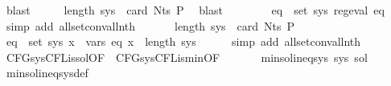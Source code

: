 \begin{isabellebody}
\ blast\isanewline
\ \ \isamarkupfalse%
\ \isamarkupfalse%
\ {\isachardoublequoteopen}length\ sys\ {\isacharequal}{\kern0pt}\ card\ {\isacharparenleft}{\kern0pt}Nts\ P{\isacharparenright}{\kern0pt}{\isachardoublequoteclose}\ \isamarkupfalse%
\ blast\isanewline
\ \ \isamarkupfalse%
\ \isamarkupfalse%
\ {\isacharasterisk}{\kern0pt}\ \isamarkupfalse%
\ {\isachardoublequoteopen}{\isasymforall}eq\ {\isasymin}\ set\ sys{\isachardot}{\kern0pt}\ reg{\isacharunderscore}{\kern0pt}eval\ eq{\isachardoublequoteclose}\ \isamarkupfalse%
\ {\isacharparenleft}{\kern0pt}simp\ add{\isacharcolon}{\kern0pt}\ all{\isacharunderscore}{\kern0pt}set{\isacharunderscore}{\kern0pt}conv{\isacharunderscore}{\kern0pt}all{\isacharunderscore}{\kern0pt}nth{\isacharparenright}{\kern0pt}\isanewline
\ \ \isamarkupfalse%
\ \isamarkupfalse%
\ {\isacharasterisk}{\kern0pt}\ {\isacartoucheopen}length\ sys\ {\isacharequal}{\kern0pt}\ card\ {\isacharparenleft}{\kern0pt}Nts\ P{\isacharparenright}{\kern0pt}{\isacartoucheclose}\ \isamarkupfalse%
\ {\isachardoublequoteopen}{\isasymforall}eq\ {\isasymin}\ set\ sys{\isachardot}{\kern0pt}\ {\isasymforall}x\ {\isasymin}\ vars\ eq{\isachardot}{\kern0pt}\ x\ {\isacharless}{\kern0pt}\ length\ sys{\isachardoublequoteclose}\isanewline
\ \ \ \ \isamarkupfalse%
\ {\isacharparenleft}{\kern0pt}simp\ add{\isacharcolon}{\kern0pt}\ all{\isacharunderscore}{\kern0pt}set{\isacharunderscore}{\kern0pt}conv{\isacharunderscore}{\kern0pt}all{\isacharunderscore}{\kern0pt}nth{\isacharparenright}{\kern0pt}\isanewline
\ \ \isamarkupfalse%
\ \isamarkupfalse%
\ CFG{\isacharunderscore}{\kern0pt}sys{\isacharunderscore}{\kern0pt}CFL{\isacharunderscore}{\kern0pt}is{\isacharunderscore}{\kern0pt}sol{\isacharbrackleft}{\kern0pt}OF\ {\isacharasterisk}{\kern0pt}{\isacharbrackright}{\kern0pt}\ CFG{\isacharunderscore}{\kern0pt}sys{\isacharunderscore}{\kern0pt}CFL{\isacharunderscore}{\kern0pt}is{\isacharunderscore}{\kern0pt}min{\isacharbrackleft}{\kern0pt}OF\ {\isacharasterisk}{\kern0pt}{\isacharbrackright}{\kern0pt}\isanewline
\ \ \ \ \isamarkupfalse%
\ {\isachardoublequoteopen}min{\isacharunderscore}{\kern0pt}sol{\isacharunderscore}{\kern0pt}ineq{\isacharunderscore}{\kern0pt}sys\ sys\ sol{\isachardoublequoteclose}\ \isamarkupfalse%
\ min{\isacharunderscore}{\kern0pt}sol{\isacharunderscore}{\kern0pt}ineq{\isacharunderscore}{\kern0pt}sys{\isacharunderscore}{\kern0pt}def\ \isamarkupfalse%

\end{isabellebody}
